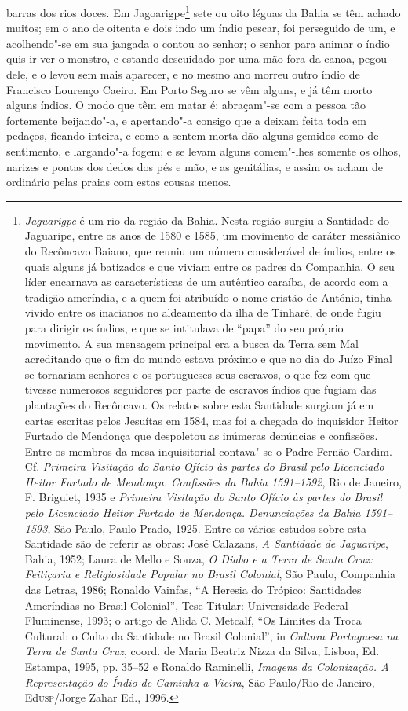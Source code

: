 barras dos rios doces. Em Jagoarigpe\footnote{ \textit{Jaguarigpe} é
um rio da região da Bahia. Nesta região surgiu a Santidade do
Jaguaripe, entre os anos de 1580 e 1585, um movimento de caráter
messiânico do Recôncavo Baiano, que reuniu um número considerável de
índios, entre os quais alguns já batizados e que viviam entre os
padres da Companhia. O seu líder encarnava as características de um
autêntico caraíba, de acordo com a tradição ameríndia, e a quem foi
atribuído o nome cristão de António, tinha vivido entre os inacianos no
aldeamento da ilha de Tinharé, de onde fugiu para dirigir os índios, e
que se intitulava de ``papa'' do seu próprio movimento. A sua mensagem
principal era a busca da Terra sem Mal acreditando que o fim do mundo
estava próximo e que no dia do Juízo Final se tornariam senhores e os
portugueses seus escravos, o que fez com que tivesse numerosos
seguidores por parte de escravos índios que fugiam das plantações do
Recôncavo. Os relatos sobre esta Santidade surgiam já em cartas
escritas pelos Jesuítas em 1584, mas foi a chegada do inquisidor Heitor
Furtado de Mendonça que despoletou as inúmeras denúncias e confissões.
Entre os membros da mesa inquisitorial contava"-se o Padre Fernão
Cardim. Cf. \textit{Primeira Visitação do Santo Ofício às partes do
Brasil pelo Licenciado Heitor Furtado de Mendonça. Confissões da Bahia
1591--1592}, Rio de Janeiro, F. Briguiet, 1935 e \textit{Primeira
Visitação do Santo Ofício às partes do Brasil pelo Licenciado Heitor
Furtado de Mendonça. Denunciações da Bahia 1591--1593}, São Paulo, Paulo
Prado, 1925. Entre os vários estudos sobre esta Santidade são de
referir as obras: José Calazans, \textit{A Santidade de Jaguaripe}, 
Bahia, 1952; Laura de Mello e Souza, \textit{O Diabo e a Terra de
Santa Cruz: Feitiçaria e Religiosidade Popular no Brasil Colonial}, 
São Paulo, Companhia das Letras, 1986; Ronaldo Vainfas, ``A Heresia do 
Trópico: Santidades Ameríndias no Brasil Colonial'', Tese Titular:
Universidade Federal Fluminense, 1993; o artigo de Alida C. Metcalf, ``Os 
Limites da Troca Cultural: o Culto da Santidade no Brasil Colonial'',
in \textit{Cultura Portuguesa na Terra de Santa Cruz}, coord. de Maria
Beatriz Nizza da Silva, Lisboa, Ed. Estampa, 1995, pp. 35--52 e Ronaldo
Raminelli, \textit{Imagens da Colonização. A Representação do Índio de
Caminha a Vieira}, São Paulo/Rio de Janeiro, Ed\textsc{usp}/Jorge Zahar Ed.,
1996.} sete ou oito léguas da Bahia se têm achado muitos; em o ano de
oitenta e dois indo um índio pescar, foi perseguido de um, e
acolhendo"-se em sua jangada o contou ao senhor; o senhor para animar o
índio quis ir ver o monstro, e estando descuidado por uma mão fora da
canoa, pegou dele, e o levou sem mais aparecer, e no mesmo ano morreu
outro índio de Francisco Lourenço Caeiro. Em Porto Seguro se vêm
alguns, e já têm morto alguns índios. O modo que têm em matar é:
abraçam"-se com a pessoa tão fortemente beijando"-a, e apertando"-a
consigo que a deixam feita toda em pedaços, ficando inteira, e como a
sentem morta dão alguns gemidos como de sentimento, e largando"-a fogem;
e se levam alguns comem"-lhes somente os olhos, narizes e pontas dos
dedos dos pés e mão, e as genitálias, e assim os acham de ordinário
pelas praias com estas cousas menos.


